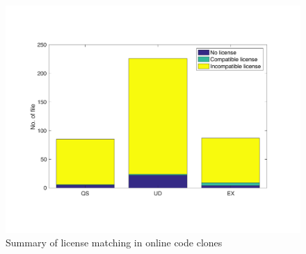 \documentclass[sigconf,review, anonymous]{acmart}
\begin{document}
\begin{figure}
	\centering
	\includegraphics[width=\linewidth]{license_violation}
	\caption{Summary of license matching in online code clones}
	\label{fig:license_violation}
\end{figure}
\end{document}
